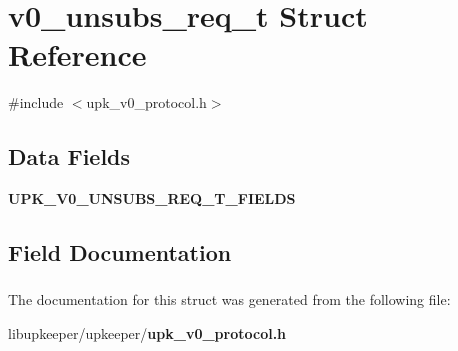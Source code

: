 \section{v0\_\-unsubs\_\-req\_\-t Struct Reference}
\label{structv0__unsubs__req__t}


{\ttfamily \#include $<$upk\_\-v0\_\-protocol.h$>$}

\subsection*{Data Fields}
\begin{DoxyCompactItemize}
\item 
{\bf UPK\_\-V0\_\-UNSUBS\_\-REQ\_\-T\_\-FIELDS}
\end{DoxyCompactItemize}


\subsection{Field Documentation}
\subsubsection[{UPK\_\-V0\_\-UNSUBS\_\-REQ\_\-T\_\-FIELDS}]{}\label{structv0__unsubs__req__t_aa0e961095f5d73ab0b098c2bef01fc82}


The documentation for this struct was generated from the following file:\begin{DoxyCompactItemize}
\item 
libupkeeper/upkeeper/{\bf upk\_\-v0\_\-protocol.h}\end{DoxyCompactItemize}
